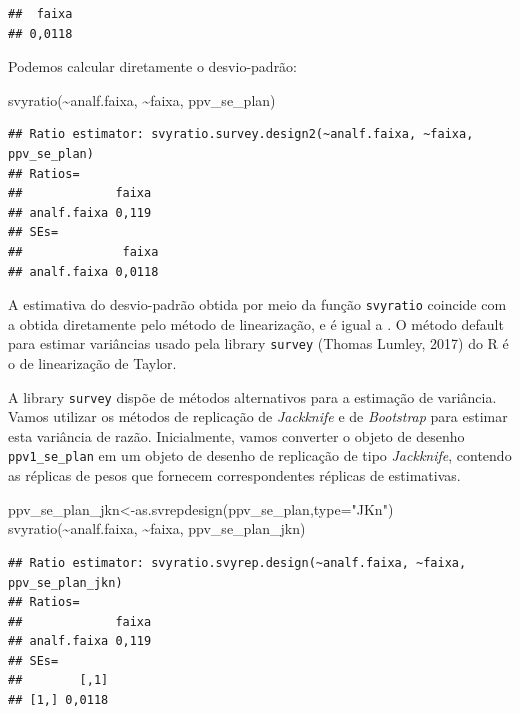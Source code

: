 \documentclass[
  12pt,
  brazilian,
]{book}
\newenvironment{Shaded}{\begin{snugshade}}{\end{snugshade}}
\newcommand{\AttributeTok}[1]{\textcolor[rgb]{0.77,0.63,0.00}{#1}}
\newcommand{\FunctionTok}[1]{\textcolor[rgb]{0.00,0.00,0.00}{#1}}
\newcommand{\NormalTok}[1]{#1}
\newcommand{\OtherTok}[1]{\textcolor[rgb]{0.56,0.35,0.01}{#1}}
\newcommand{\SpecialCharTok}[1]{\textcolor[rgb]{0.00,0.00,0.00}{#1}}
\newcommand{\StringTok}[1]{\textcolor[rgb]{0.31,0.60,0.02}{#1}}
\theoremstyle{definition}
\theoremstyle{definition}
\theoremstyle{definition}
\theoremstyle{definition}
\theoremstyle{remark}
\begin{document}
\begin{verbatim}
##  faixa 
## 0,0118
\end{verbatim}

Podemos calcular diretamente o desvio-padrão:

\begin{Shaded}
\begin{Highlighting}[]
\FunctionTok{svyratio}\NormalTok{(}\SpecialCharTok{\textasciitilde{}}\NormalTok{analf.faixa, }\SpecialCharTok{\textasciitilde{}}\NormalTok{faixa, ppv\_se\_plan)}
\end{Highlighting}
\end{Shaded}

\begin{verbatim}
## Ratio estimator: svyratio.survey.design2(~analf.faixa, ~faixa, ppv_se_plan)
## Ratios=
##             faixa
## analf.faixa 0,119
## SEs=
##              faixa
## analf.faixa 0,0118
\end{verbatim}

A estimativa do desvio-padrão obtida por meio da função \texttt{svyratio} coincide com a obtida diretamente pelo método
de linearização, e é igual a . O método default para estimar variâncias
usado pela library \texttt{survey} (Thomas Lumley, 2017) do R é o de linearização de Taylor.

A library \texttt{survey} dispõe de métodos alternativos para a estimação de variância. Vamos utilizar os métodos de replicação
de \emph{Jackknife} e de \emph{Bootstrap} para estimar esta variância de razão. Inicialmente, vamos converter o objeto de desenho \texttt{ppv1\_se\_plan} em um objeto de desenho de replicação de tipo \emph{Jackknife}, contendo as réplicas de pesos que fornecem correspondentes réplicas de estimativas.

\begin{Shaded}
\begin{Highlighting}[]
\NormalTok{ppv\_se\_plan\_jkn}\OtherTok{\textless{}{-}}\FunctionTok{as.svrepdesign}\NormalTok{(ppv\_se\_plan,}\AttributeTok{type=}\StringTok{"JKn"}\NormalTok{)}
\FunctionTok{svyratio}\NormalTok{(}\SpecialCharTok{\textasciitilde{}}\NormalTok{analf.faixa, }\SpecialCharTok{\textasciitilde{}}\NormalTok{faixa, ppv\_se\_plan\_jkn)}
\end{Highlighting}
\end{Shaded}

\begin{verbatim}
## Ratio estimator: svyratio.svyrep.design(~analf.faixa, ~faixa, ppv_se_plan_jkn)
## Ratios=
##             faixa
## analf.faixa 0,119
## SEs=
##        [,1]
## [1,] 0,0118
\end{verbatim}
\end{document}
